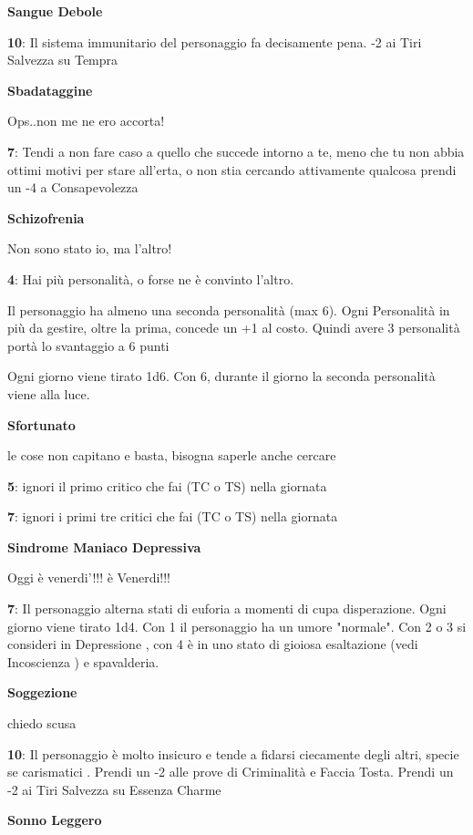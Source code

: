 \documentclass[a4paper,11pt,twoside,openany]{book}
\begin{document}
{\textbf{Sangue Debole}

\textbf{10}: Il sistema immunitario del personaggio fa decisamente pena. -2 ai Tiri Salvezza su Tempra

\textbf{Sbadataggine}

Ops..non me ne ero accorta!

\textbf{7}: Tendi a non fare caso a quello che succede intorno a te, meno che tu non abbia ottimi motivi per stare all'erta, o non stia cercando attivamente qualcosa prendi un -4 a Consapevolezza

\textbf{Schizofrenia}

Non sono stato io, ma l'altro!

\textbf{4}: Hai più personalità, o forse ne è convinto l'altro.

Il personaggio ha almeno una seconda personalità (max 6).
Ogni Personalità in più da gestire, oltre la prima, concede un +1 al costo.
Quindi avere 3 personalità portà lo svantaggio a 6 punti

Ogni giorno viene tirato 1d6. Con 6, durante il giorno la seconda personalità viene alla luce.

\textbf{Sfortunato}

le cose non capitano e basta, bisogna saperle anche cercare

\textbf{5}: ignori il primo critico che fai (TC o TS) nella giornata

\textbf{7}: ignori i primi tre critici che fai (TC o TS) nella giornata

\textbf{Sindrome Maniaco Depressiva}

Oggi è venerdi'!!! è Venerdi!!!

\textbf{7}: Il personaggio alterna stati di euforia a momenti di cupa disperazione. Ogni giorno viene tirato 1d4. Con 1 il personaggio ha un umore "normale". Con 2 o 3 si consideri in Depressione , con 4 è in uno stato di gioiosa esaltazione (vedi Incoscienza ) e spavalderia.

\textbf{Soggezione}

chiedo scusa

\textbf{10}: Il personaggio è molto insicuro e tende a fidarsi ciecamente degli altri, specie se carismatici . Prendi un -2 alle prove di Criminalità e Faccia Tosta.
Prendi un -2 ai Tiri Salvezza su Essenza Charme

\textbf{Sonno Leggero}

}
\end{document}

